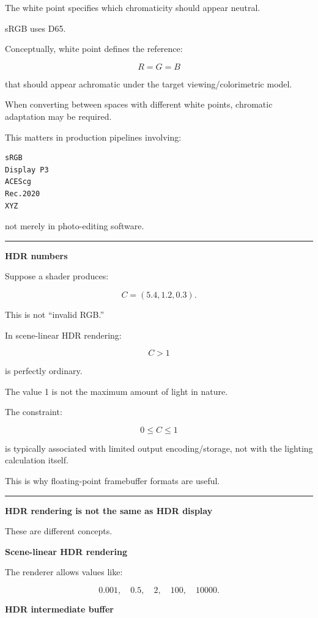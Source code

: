 The white point specifies which chromaticity should appear neutral.

sRGB uses D65.

Conceptually, white point defines the reference:

\[
R=G=B
\]

that should appear achromatic under the target viewing/colorimetric model.

When converting between spaces with different white points, chromatic adaptation may be required.

This matters in production pipelines involving:

\begin{verbatim}
sRGB
Display P3
ACEScg
Rec.2020
XYZ
\end{verbatim}

not merely in photo-editing software.

\begin{center}\rule{0.5\linewidth}{0.5pt}\end{center}

\textbf{HDR numbers}

Suppose a shader produces:

\[
C=(5.4,1.2,0.3).
\]

This is not ``invalid RGB.''

In scene-linear HDR rendering:

\[
C>1
\]

is perfectly ordinary.

The value 1 is not the maximum amount of light in nature.

The constraint:

\[
0\le C\le1
\]

is typically associated with limited output encoding/storage, not with the lighting calculation itself.

This is why floating-point framebuffer formats are useful.

\begin{center}\rule{0.5\linewidth}{0.5pt}\end{center}

\textbf{HDR rendering is not the same as HDR display}

These are different concepts.

\textbf{Scene-linear HDR rendering}

The renderer allows values like:

\[
0.001,\quad0.5,\quad2,\quad100,\quad10000.
\]

\textbf{HDR intermediate buffer}

